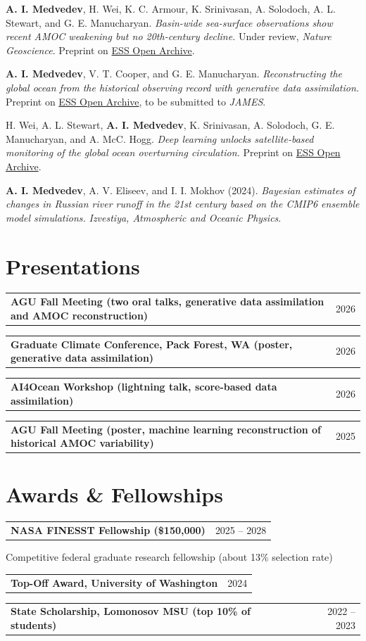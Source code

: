 \documentclass[letterpaper,10pt]{article}
\makeatletter
\newcommand{\entry}[2]{%
  \noindent\begin{tabularx}{\textwidth}{@{}X r@{}}%
    \textbf{#1} & #2 \\
  \end{tabularx}\par\nopagebreak
}
\makeatother
\begin{document}
\textbf{A. I. Medvedev}, H. Wei, K. C. Armour, K. Srinivasan, A. Solodoch, A. L. Stewart, and G. E. Manucharyan.
\textit{Basin-wide sea-surface observations show recent AMOC weakening but no 20th-century decline.}
Under review, \textit{Nature Geoscience}. Preprint on \href{https://doi.org/10.22541/essoar.15002298/v1}{ESS Open Archive}.

\smallskip
\textbf{A. I. Medvedev}, V. T. Cooper, and G. E. Manucharyan.
\textit{Reconstructing the global ocean from the historical observing record with generative data assimilation.}
Preprint on \href{https://doi.org/10.22541/essoar.15011822/v1}{ESS Open Archive}, to be submitted to \textit{JAMES}.

\smallskip
H. Wei, A. L. Stewart, \textbf{A. I. Medvedev}, K. Srinivasan, A. Solodoch, G. E. Manucharyan, and A. McC. Hogg.
\textit{Deep learning unlocks satellite-based monitoring of the global ocean overturning circulation.}
Preprint on \href{https://essopenarchive.org/doi/abs/10.22541/essoar.15004679}{ESS Open Archive}.

\smallskip
\textbf{A. I. Medvedev}, A. V. Eliseev, and I. I. Mokhov (2024).
\textit{Bayesian estimates of changes in Russian river runoff in the 21st century based on the CMIP6 ensemble model simulations.}
\textit{Izvestiya, Atmospheric and Oceanic Physics}.

\section{Presentations}

\entry{AGU Fall Meeting \textnormal{(two oral talks, generative data assimilation and AMOC reconstruction)}}{2026}
\entry{Graduate Climate Conference, Pack Forest, WA \textnormal{(poster, generative data assimilation)}}{2026}
\entry{AI4Ocean Workshop \textnormal{(lightning talk, score-based data assimilation)}}{2026}
\entry{AGU Fall Meeting \textnormal{(poster, machine learning reconstruction of historical AMOC variability)}}{2025}

\section{Awards \& Fellowships}

\entry{NASA FINESST Fellowship (\$150,000)}{2025 -- 2028}
Competitive federal graduate research fellowship (about 13\% selection rate)

\entry{Top-Off Award, University of Washington}{2024}
\entry{State Scholarship, Lomonosov MSU (top 10\% of students)}{2022 -- 2023}
\end{document}
